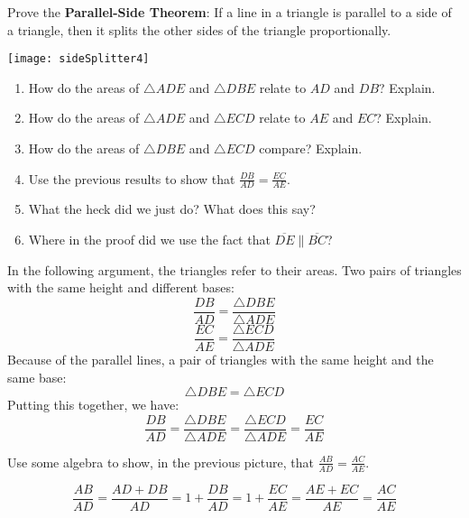 \documentclass[nooutcomes]{ximera}
\begin{document}
\begin{problem}
Prove the \textbf{Parallel-Side Theorem}:  If a line in a triangle is parallel to a side of a triangle, then it splits the other sides of the triangle proportionally. 
\begin{image}
\texttt{[image: sideSplitter4]}
\end{image}
\begin{enumerate}
\item How do the areas of $\triangle ADE$ and $\triangle DBE$ relate to $AD$ and $DB$?  Explain.  
\item How do the areas of $\triangle ADE$ and $\triangle ECD$ relate to $AE$ and $EC$?  Explain. 
\item How do the areas of $\triangle DBE$ and $\triangle ECD$ compare?  Explain.  
\item Use the previous results to show that $\frac{DB}{AD} = \frac{EC}{AE}$.  
\item What the heck did we just do?  What does this say?
\item Where in the proof did we use the fact that $\overline{DE} \parallel \overline{BC}$?  
\end{enumerate}
\vfill
\end{problem}

\newpage
\begin{teachingnote}
In the following argument, the triangles refer to their areas.  
Two pairs of triangles with the same height and different bases:  
\[
\frac{DB}{AD} = \frac{\triangle DBE}{\triangle ADE}
\]
\[
\frac{EC}{AE} = \frac{\triangle ECD}{\triangle ADE}
\]
Because of the parallel lines, a pair of triangles with the same height and the same base:  
\[
\triangle DBE = \triangle ECD
\]
Putting this together, we have:  
\[
\frac{DB}{AD} = \frac{\triangle DBE}{\triangle ADE} = \frac{\triangle ECD}{\triangle ADE}
=\frac{EC}{AE}
\]
\end{teachingnote}


\begin{problem}
Use some algebra to show, in the previous picture, that $\frac{AB}{AD} = \frac{AC}{AE}$.
\vspace{1in}
\end{problem}

\begin{teachingnote}
\[
\frac{AB}{AD} = \frac{AD+DB}{AD} = 1 + \frac{DB}{AD} =  1 + \frac{EC}{AE} 
= \frac{AE + EC}{AE} = \frac{AC}{AE}
\]
\end{teachingnote}
\end{document}
